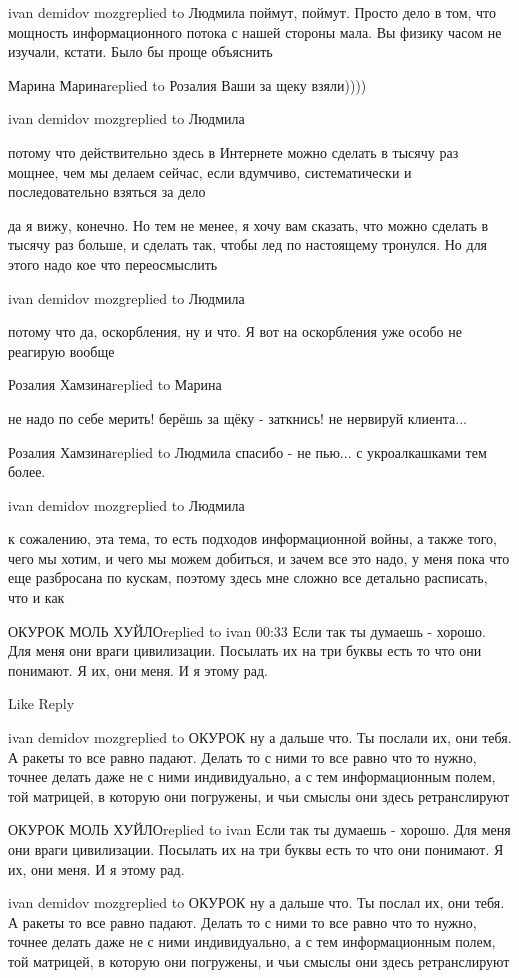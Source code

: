 ivan demidov mozgreplied to Людмила
поймут, поймут. Просто дело в том, что мощность информационного потока с нашей стороны мала. Вы физику часом не изучали, кстати. Было бы проще объяснить

Марина Маринаreplied to Розалия
Ваши за щеку взяли))))

ivan demidov mozgreplied to Людмила

потому что действительно здесь в Интернете можно сделать в тысячу раз мощнее,
чем мы делаем сейчас, если вдумчиво, систематически и последовательно взяться
за дело

да я вижу, конечно. Но тем не менее, я хочу вам сказать, что можно сделать в
тысячу раз больше, и сделать так, чтобы лед по настоящему тронулся. Но для
этого надо кое что переосмыслить

ivan demidov mozgreplied to Людмила

потому что да, оскорбления, ну и что. Я вот на оскорбления уже особо не
реагирую вообще

Розалия Хамзинаreplied to Марина

не надо по себе мерить! берёшь за щёку - заткнись! не нервируй клиента...

Розалия Хамзинаreplied to Людмила
спасибо - не пью... с укроалкашками тем более.

ivan demidov mozgreplied to Людмила

к сожалению, эта тема, то есть подходов информационной войны, а также того,
чего мы хотим, и чего мы можем добиться, и зачем все это надо, у меня пока что
еще разбросана по кускам, поэтому здесь мне сложно все детально расписать, что
и как

ОКУРОК МОЛЬ ХУЙЛОreplied to ivan
00:33
Если так ты думаешь - хорошо. Для меня они враги цивилизации. Посылать их на три буквы есть то что они понимают.
Я их, они меня. И я этому рад.

    Like
    Reply

ivan demidov mozgreplied to ОКУРОК
ну а дальше что. Ты послали их, они тебя. А ракеты то все равно падают. Делать то с ними то все равно что то нужно, точнее делать даже не с ними индивидуально, а с тем информационным полем, той матрицей, в которую они погружены, и чьи смыслы они здесь ретранслируют


ОКУРОК МОЛЬ ХУЙЛОreplied to ivan
Если так ты думаешь - хорошо. Для меня они враги цивилизации. Посылать их на три буквы есть то что они понимают.
Я их, они меня. И я этому рад.

ivan demidov mozgreplied to ОКУРОК
ну а дальше что. Ты послал их, они тебя. А ракеты то все равно падают. Делать то с ними то все равно что то нужно, точнее делать даже не с ними индивидуально, а с тем информационным полем, той матрицей, в которую они погружены, и чьи смыслы они здесь ретранслируют

